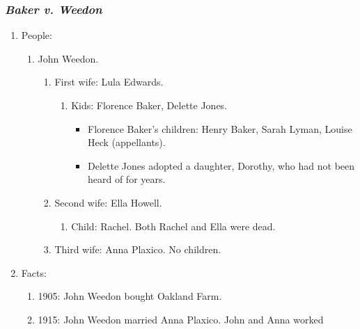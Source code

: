 % 

\subsubsection{\emph{Baker v. Weedon}}

\begin{enumerate}
    \item People:
    \begin{enumerate}
        \item John Weedon.
        \begin{enumerate}
            \item First wife: Lula Edwards.
            \begin{enumerate}
                \item Kids: Florence Baker, Delette Jones.
                \begin{itemize}
                    \item Florence Baker's children: Henry Baker, Sarah Lyman, 
                    Louise Heck (appellants).
                    \item Delette Jones adopted a daughter, Dorothy, who had 
                    not been heard of for years.
                \end{itemize}
            \end{enumerate}
            \item Second wife: Ella Howell.
            \begin{enumerate}
                \item Child: Rachel. Both Rachel and Ella were dead.
            \end{enumerate}
            \item Third wife: Anna Plaxico. No children.
        \end{enumerate}
    \end{enumerate}
    \item Facts:
    \begin{enumerate}
        \item 1905: John Weedon bought Oakland Farm.
        \item 1915: John Weedon married Anna Plaxico. John and Anna worked 

\end{enumerate}
\end{enumerate}

